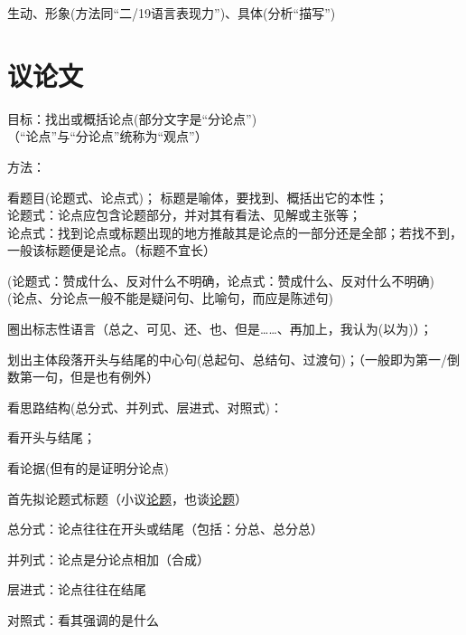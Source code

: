   生动、形象(方法同``二/19语言表现力'')、具体(分析``描写'')

\section{议论文}
目标：找出或概括论点(部分文字是``分论点'')\\
（``论点''与``分论点''统称为``观点''）\par
方法：\begin{asparaenum}[(1)]\item 看题目(论题式、论点式)；
标题是喻体，要找到、概括出它的本性；\\
论题式：论点应包含论题部分，并对其有看法、见解或主张等；\\
论点式：找到论点或标题出现的地方推敲其是论点的一部分还是全部；若找不到，一般该标题便是论点。（标题不宜长）\par
(论题式：赞成什么、反对什么不明确，论点式：赞成什么、反对什么不明确)\\
(论点、分论点一般不能是疑问句、比喻句，而应是陈述句)

\item 圈出标志性语言（总之、可见、还、也、但是\ldots{}\ldots{}、再加上，我认为(以为)）；
\item 划出主体段落开头与结尾的中心句(总起句、总结句、过渡句)；（一般即为第一/倒数第一句，但是也有例外）
\item 看思路结构(总分式、并列式、层进式、对照式)：
\item 看开头与结尾；
\item 看论据(但有的是证明分论点)
\end{asparaenum}

\begin{asparaenum}
\item 首先拟论题式标题（小议\uline{论题}，也谈\uline{论题}）
\end{asparaenum}

\begin{asparaenum}[(1)]
\item 总分式：论点往往在开头或结尾（包括：分总、总分总）
\item 并列式：论点是分论点相加（合成）
\item 层进式：论点往往在结尾
\item 对照式：看其强调的是什么
\end{asparaenum}

